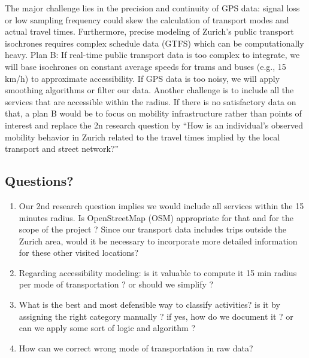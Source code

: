 \documentclass[
  letterpaper,
  DIV=11,
  numbers=noendperiod]{scrartcl}
\providecommand{\tightlist}{%
  \setlength{\itemsep}{0pt}\setlength{\parskip}{0pt}}
\begin{document}
The major challenge lies in the precision and continuity of GPS data:
signal loss or low sampling frequency could skew the calculation of
transport modes and actual travel times. Furthermore, precise modeling
of Zurich's public transport isochrones requires complex schedule data
(GTFS) which can be computationally heavy. Plan B: If real-time public
transport data is too complex to integrate, we will base isochrones on
constant average speeds for trams and buses (e.g., 15 km/h) to
approximate accessibility. If GPS data is too noisy, we will apply
smoothing algorithms or filter our data. Another challenge is to include
all the services that are accessible within the radius. If there is no
satisfactory data on that, a plan B would be to focus on mobility
infrastructure rather than points of interest and replace the 2n
research question by ``How is an individual's observed mobility behavior
in Zurich related to the travel times implied by the local transport and
street network?''

\subsection{Questions?}\label{questions}

\begin{enumerate}
\def\labelenumi{\arabic{enumi}.}
\tightlist
\item
  Our 2nd research question implies we would include all services within
  the 15 minutes radius. Is OpenStreetMap (OSM) appropriate for that and
  for the scope of the project ? Since our transport data includes trips
  outside the Zurich area, would it be necessary to incorporate more
  detailed information for these other visited locations?
\item
  Regarding accessibility modeling: is it valuable to compute it 15 min
  radius per mode of transportation ? or should we simplify ?
\item
  What is the best and most defensible way to classify activities? is it
  by assigning the right category manually ? if yes, how do we document
  it ? or can we apply some sort of logic and algorithm ?
\item
  How can we correct wrong mode of transportation in raw data?
\end{enumerate}
\end{document}
